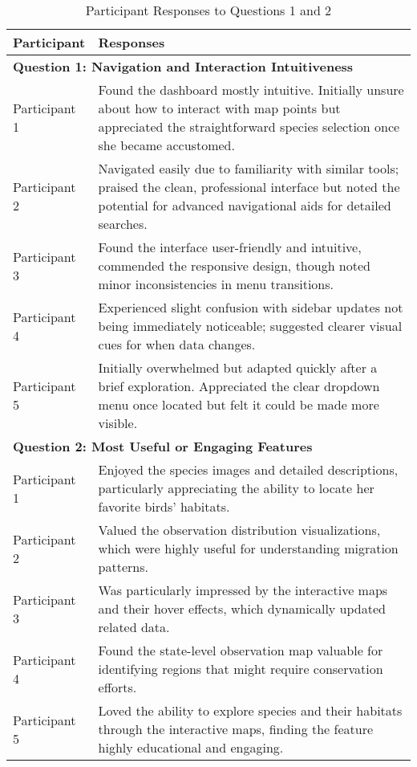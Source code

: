 \begin{table}[H]
    \centering
    \begin{tabular}{p{3cm} | p{12cm}}
        \hline
        \textbf{Participant} & \textbf{Responses} \\
        \hline
        \multicolumn{2}{l}{\textbf{Question 1: Navigation and Interaction Intuitiveness}} \\
        \hline
        Participant 1 & Found the dashboard mostly intuitive. Initially unsure about how to interact with map points but appreciated the straightforward species selection once she became accustomed. \\
        \hline
        Participant 2 & Navigated easily due to familiarity with similar tools; praised the clean, professional interface but noted the potential for advanced navigational aids for detailed searches. \\
        \hline
        Participant 3 & Found the interface user-friendly and intuitive, commended the responsive design, though noted minor inconsistencies in menu transitions. \\
        \hline
        Participant 4 & Experienced slight confusion with sidebar updates not being immediately noticeable; suggested clearer visual cues for when data changes. \\
        \hline
        Participant 5 & Initially overwhelmed but adapted quickly after a brief exploration. Appreciated the clear dropdown menu once located but felt it could be made more visible. \\
        \hline
        \multicolumn{2}{l}{\textbf{Question 2: Most Useful or Engaging Features}} \\
        \hline
        Participant 1 & Enjoyed the species images and detailed descriptions, particularly appreciating the ability to locate her favorite birds' habitats. \\
        \hline
        Participant 2 & Valued the observation distribution visualizations, which were highly useful for understanding migration patterns. \\
        \hline
        Participant 3 & Was particularly impressed by the interactive maps and their hover effects, which dynamically updated related data. \\
        \hline
        Participant 4 & Found the state-level observation map valuable for identifying regions that might require conservation efforts. \\
        \hline
        Participant 5 & Loved the ability to explore species and their habitats through the interactive maps, finding the feature highly educational and engaging. \\
        \hline
    \end{tabular}
    \caption{Participant Responses to Questions 1 and 2}
    \label{tab:responses1}
\end{table}


